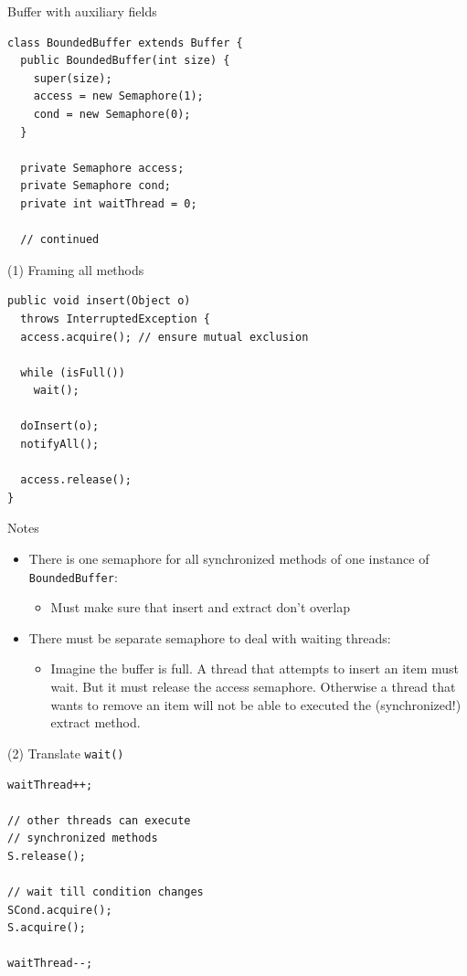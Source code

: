 \begin{frame}[fragile]{Buffer with auxiliary fields}
\begin{lstlisting}
class BoundedBuffer extends Buffer {
  public BoundedBuffer(int size) { 
    super(size);
    access = new Semaphore(1);
    cond = new Semaphore(0);
  }

  private Semaphore access;
  private Semaphore cond;
  private int waitThread = 0;
  
  // continued
\end{lstlisting}
\end{frame}

\begin{frame}[fragile]{(1) Framing all methods}
\begin{lstlisting}
public void insert(Object o)
  throws InterruptedException {
  access.acquire(); // ensure mutual exclusion

  while (isFull())
    wait();

  doInsert(o);	
  notifyAll();

  access.release();
}
\end{lstlisting}
\end{frame}

\begin{frame}{Notes}
  \begin{itemize}
  \item There is one semaphore for all synchronized methods of one
    instance of \lstinline!BoundedBuffer!:
    \begin{itemize}
    \item Must make sure that insert and extract don't overlap
    \end{itemize}
  \item There must be separate semaphore to deal with waiting
    threads:
    \begin{itemize}
    \item Imagine the buffer is full. A thread that attempts to insert
      an item must wait. But it must release the access
      semaphore. Otherwise a thread that wants to remove an item will
      not be able to executed the (synchronized!) extract method.
    \end{itemize}
  \end{itemize}
\end{frame}

\begin{frame}[fragile]{(2) Translate \lstinline!wait()!}
\begin{lstlisting}
waitThread++;

// other threads can execute 
// synchronized methods 
S.release(); 

// wait till condition changes
SCond.acquire(); 
S.acquire();

waitThread--;
\end{lstlisting}
\end{frame}

